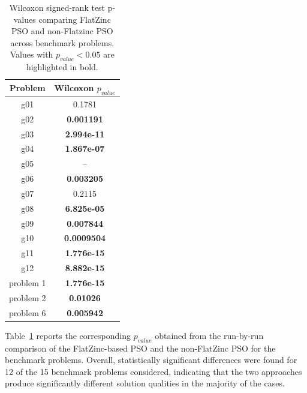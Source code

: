\begin{table}[t]
	\centering
	\footnotesize
	\caption{Wilcoxon signed-rank test p-values comparing FlatZinc PSO and non-Flatzinc PSO across benchmark problems. Values with $p_{value} < 0.05$ are highlighted in bold.}
	\label{tab:wilcoxon_pvalues}
	\setlength{\tabcolsep}{5pt}
	\begin{tabular}{cc}
		\toprule
		\textbf{Problem} & \textbf{Wilcoxon $p_{value}$} \\
		\midrule
		
		g01 & 0.1781 \\
		\midrule
		
		g02 & \textbf{0.001191} \\
		\midrule
		
		g03 & \textbf{2.994e-11} \\
		\midrule
		
		g04 & \textbf{1.867e-07} \\
		\midrule
		
		g05 & -- \\
		\midrule
		
		g06 & \textbf{0.003205} \\
		\midrule
		
		g07 & 0.2115 \\
		\midrule
		
		g08 & \textbf{6.825e-05} \\
		\midrule
		
		g09 & \textbf{0.007844} \\
		\midrule
		
		g10 & \textbf{0.0009504} \\
		\midrule
		
		g11 & \textbf{1.776e-15} \\
		\midrule
		
		g12 & \textbf{8.882e-15} \\
		\midrule
		
		problem 1 & \textbf{1.776e-15} \\
		\midrule
		
		problem 2 & \textbf{0.01026} \\
		\midrule
		
		problem 6 & \textbf{0.005942} \\
		
		\bottomrule
	\end{tabular}
\end{table}

Table~\ref{tab:wilcoxon_pvalues} reports the corresponding $p_{value}$ obtained from the run-by-run comparison of the FlatZinc-based PSO and the non-FlatZinc PSO for the benchmark problems. Overall, statistically significant differences were found for 12 of the 15 benchmark problems considered, indicating that the two approaches produce significantly different solution qualities in the majority of the cases.


